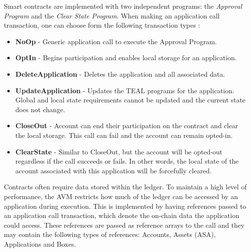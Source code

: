 Smart contracts are implemented with two independent programs: the \textit{Approval Program} and the \textit{Clear State Program}. When making an application call transaction, one can choose form the following transaction types \cite{noauthor_overview_nodate}:
\begin{itemize}
    \item \textbf{NoOp} - Generic application call to execute the Approval Program.
    \item \textbf{OptIn} - Begins participation and enables local storage for an application.
    \item \textbf{DeleteApplication} - Deletes the application and all associated data.
    \item \textbf{UpdateApplication} - Updates the \ac{TEAL} programs for the application. Global and local state requirements cannot be updated and the current state does not change.
    \item \textbf{CloseOut} - Account can end their participation on the contract and clear the local storage. This call can fail and the account can remain opted-in.
    \item \textbf{ClearState} - Similar to CloseOut, but the account will be opted-out regardless if the call succeeds or fails. In other words, the local state of the account associated with this application will be forcefully cleared.
\end{itemize}

Contracts often require data stored within the ledger. To maintain a high level of performance, the \ac{AVM} restricts how much of the ledger can be accessed by an application during execution. This is implemented by having references passed to an application call transaction, which denote the on-chain data the application could access. These references are passed as reference arrays to the call and they may contain the following types of references: Accounts, Assets (\ac{ASA}), Applications and Boxes.

